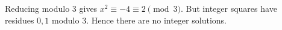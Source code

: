 Reducing modulo $3$ gives $x^2\equiv-4\equiv2\pmod3$. But integer squares have residues $0,1$ modulo $3$. Hence there are no integer solutions.
